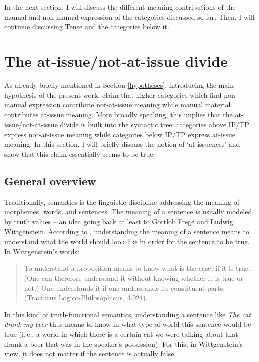 In the next section, I will discuss the different meaning contributions of the manual and non-manual expression of the categories discussed so far. Then, I will continue discussing Tense and the categories below it.




\section{The at-issue/not-at-issue divide}\label{atnotissue}
As already briefly mentioned in Section \ref{hypotheses}, introducing the main hypothesis of the present work, \citet{bross2017scope} claim that higher categories which find non-manual expression contribute not-at-issue meaning while manual material contributes at-issue meaning. More broadly speaking, this implies that the at-issue/not-at-issue divide is built into the syntactic tree: categories above IP/TP express not-at-issue meaning while categories below IP/TP express at-issue meaning. In this section, I will briefly discuss the notion of `at-issueness' and show that this claim essentially seems to be true.

\subsection{General overview}
Traditionally, semantics is the linguistic discipline addressing the meaning of morphemes, words, and sentences. The meaning of a sentence is usually modeled by truth values -- an idea going back at least to Gottlob Frege and Ludwig Wittgenstein. According to \citet{wittgenstein1922trac}, understanding the meaning of a sentence means to understand what the world should look like in order for the sentence to be true. In Wittgenstein's words:

\begin{quote}
To understand a proposition means to know what is the case, if it is true. (One can therefore understand it without knowing whether it is true or not.) One understands it if one understands its constituent parts. (Tractatus Logico-Philosophicus, 4.024).
\end{quote} 

\noindent In this kind of truth-functional semantics, understanding a sentence like \textit{The cat drank my beer} thus means to know in what type of world this sentence would be true (i.\,e., a world in which there is a certain cat we were talking about that drank a beer that was in the speaker's possession). For this, in Wittgenstein's view, it does not matter if the sentence is actually false. 

